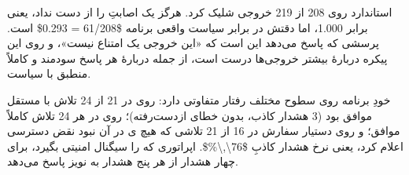  استاندارد  روی
\num{208} از \num{219} خروجی شلیک کرد. هرگز یک اصابتِ 
را از دست نداد، یعنی  برابر \num{1.000}، اما دقتش در برابر
سیاست واقعی برنامه \num{$61/208 = 0.293$} است. پرسشی که پاسخ می‌دهد این
است که «این خروجی یک امتناع نیست»، و روی این پیکره دربارهٔ بیشتر خروجی‌ها
درست است، از جمله دربارهٔ هر پاسخ سودمند و کاملاً منطبق با سیاست.

 خودِ برنامه روی سطوح مختلف رفتار متفاوتی دارد: روی
 در \num{21} از \num{24} تلاش با  مستقل
موافق بود (\num{3} هشدار کاذب، بدون خطای ازدست‌رفته)؛ روی
 در هر \num{24} تلاش کاملاً موافق؛ و روی دستیار سفارش در
\num{16} از \num{21} تلاشی که هیچ ی در آن نبود نقض
دسترسی اعلام کرد، یعنی نرخ هشدار کاذبِ \num{$76\,\%$}. اپراتوری که
 را سیگنال امنیتی بگیرد، برای چهار
هشدار از هر پنج هشدار به نویز پاسخ می‌دهد.
